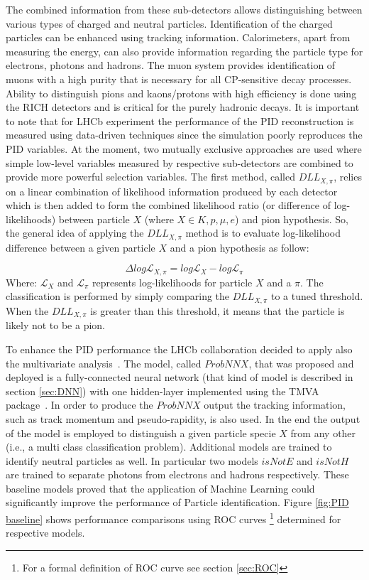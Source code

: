 The combined information from these sub-detectors allows distinguishing between various types of charged and neutral particles. Identification of the charged particles can be enhanced using tracking information. Calorimeters, apart from measuring the energy, can also provide information regarding the particle type for electrons, photons and hadrons. The muon system provides identification of muons with a high purity that is necessary for all CP-sensitive decay processes. Ability to distinguish pions and kaons/protons with high efficiency is done using the RICH detectors and is critical for the purely hadronic decays. It is important to note that for LHCb experiment the performance of the PID reconstruction is measured using data-driven techniques since the simulation poorly reproduces the PID variables. At the moment, two mutually exclusive approaches are used where simple low-level variables measured by respective sub-detectors are combined to provide more powerful selection variables. The first method, called $DLL_{X,\pi}$, relies on a linear combination of likelihood information produced by each detector which is then added to form the combined likelihood ratio (or difference of log-likelihoods) between particle $X$ (where $X \in {K, p, \mu, e}$) and pion hypothesis. So, the general idea of applying the $DLL_{X,\pi}$ method is to evaluate log-likelihood difference between a given particle $X$ and a pion hypothesis as follow:

\begin{equation}
\Delta log \mathcal{L}_{X,\pi} = log \mathcal{L}_{X} - log \mathcal{L}_{\pi}  
\end{equation}
Where: $ \mathcal{L}_{X}$ and $ \mathcal{L}_{\pi}$ represents log-likelihoods for particle $X$ and a $\pi$. The classification is performed by simply comparing the $DLL_{X,\pi}$ to a tuned threshold. When the $DLL_{X,\pi}$ is greater than this threshold, it means that the particle is likely not to be a pion. 


To enhance the PID performance the LHCb collaboration decided to apply also the multivariate analysis~\cite{PID}. The model, called $ProbNNX$, that was proposed and deployed is a fully-connected neural network (that kind of model is described in section \ref{sec:DNN}) with one hidden-layer implemented using the TMVA package~\cite{TMVA}. In order to produce the $ProbNNX$ output the tracking information, such as track momentum and pseudo-rapidity, is also used. In the end the output of the model is employed to distinguish a given particle specie $X$ from any other (i.e., a multi class classification problem). Additional models are trained to identify neutral particles as well. In particular two models $isNotE$ and $isNotH$ are trained to separate photons from electrons and hadrons respectively.
These baseline models proved that the application of Machine Learning could significantly improve the performance of Particle identification. Figure \ref{fig:PID baseline} shows performance comparisons using ROC curves \footnote{For a formal definition of ROC curve see section \ref{sec:ROC}} determined for respective models.

